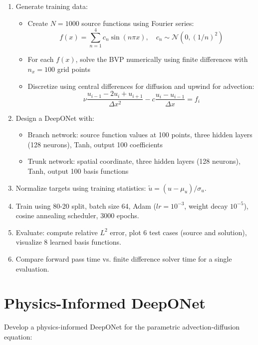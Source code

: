 \documentclass[11pt]{article}
\begin{document}
	\begin{enumerate}
		\item[\textbf{a)}] Generate training data:
		\begin{itemize}
			\item Create $N = 1000$ source functions using Fourier series:
			\begin{equation*}
				f(x) = \sum_{n=1}^{4} c_n \sin(n\pi x), \quad c_n \sim \mathcal{N}(0, (1/n)^2)
			\end{equation*}
			\item For each $f(x)$, solve the BVP numerically using finite differences with $n_x = 100$ grid points
			\item Discretize using central differences for diffusion and upwind for advection:
			\begin{equation*}
				\nu\frac{u_{i-1} - 2u_i + u_{i+1}}{\Delta x^2} - c\frac{u_{i} - u_{i-1}}{\Delta x} = f_i
			\end{equation*}
		\end{itemize}
		
		\item[\textbf{b)}] Design a DeepONet with:
		\begin{itemize}
			\item Branch network: source function values at 100 points, three hidden layers (128 neurons), Tanh, output 100 coefficients
			\item Trunk network: spatial coordinate, three hidden layers (128 neurons), Tanh, output 100 basis functions
		\end{itemize}
		
		\item[\textbf{c)}] Normalize targets using training statistics: $\tilde{u} = (u - \mu_u)/\sigma_u$.
		
		\item[\textbf{d)}] Train using 80-20 split, batch size 64, Adam ($lr = 10^{-3}$, weight decay $10^{-5}$), cosine annealing scheduler, 3000 epochs.
		
		\item[\textbf{e)}] Evaluate: compute relative $L^2$ error, plot 6 test cases (source and solution), visualize 8 learned basis functions.
		
		\item[\textbf{f)}] Compare forward pass time vs. finite difference solver time for a single evaluation.
	\end{enumerate}
	
	\section{Physics-Informed DeepONet}
	Develop a physics-informed DeepONet for the parametric advection-diffusion equation:
	
\end{document}
